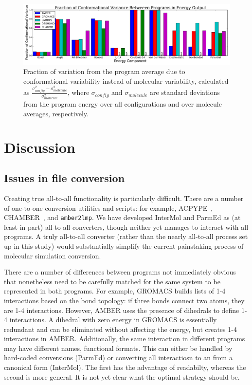 \begin{figure}[h]
\includegraphics[width=\textwidth]{fractionofvariation.pdf}   
\caption{Fraction of variation from the program average due to
  conformational variability instead of molecular variability,
  calculated as
  $\frac{\sigma^2_{config}-\sigma^2_{molecule}}{\sigma^2_{molecule}}$,
  where $\sigma_{config}$ and $\sigma_{molecule}$ are standard
  deviations from the program energy over all configurations and over
  molecule averages, respectively.
\label{fig:confvariability}}
\end{figure}

\section*{Discussion}

\subsection*{Issues in file conversion}
Creating true all-to-all functionality is particularly
difficult. There are a number of one-to-one conversion utilities and
scripts: for example, ACPYPE~\cite{sousa_da_silva_acpype_2012},
CHAMBER~\citep{crowley_chamber:_2009}, and {\tt amber2lmp}.  We have
developed InterMol and ParmEd as (at least in part) all-to-all
converters, though neither yet manages to interact with all programs.
A truly all-to-all converter (rather than the nearly all-to-all
process set up in this study) would substantially simplify the current
painstaking process of molecular simulation conversion.

There are a number of differences between programs not immediately
obvious that nonetheless need to be carefully matched for the same
system to be represented in both programs.  For example, GROMACS
builds lists of 1-4 interactions based on the bond topology: if three
bonds connect two atoms, they are 1-4 interactions. However, AMBER
uses the presence of dihedrals to define 1-4 interactions. A dihedral
with zero energy in GROMACS is essentially redundant and can be
eliminated without affecting the energy, but creates 1-4 interactions
in AMBER.  Additionally, the same interaction in different programs
may have different names, functional formats. This can either be
handled by hard-coded conversions (ParmEd) or converting all
interactiosn to an from a canonical form (InterMol).  The first has
the advantage of readabilty, whereas the second is more general.  It
is not yet clear what the optimal strategy should be.

